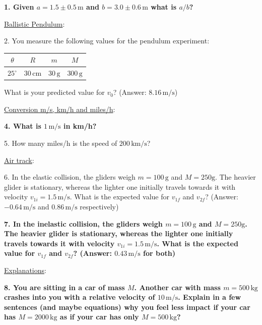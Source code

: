 {\bf{1. Given $a = 1.5 \pm 0.5\, \textrm{m}$ and $b = 3.0 \pm 0.6\, \textrm{m}$ what is $a/b$?}}\myskip

\noindent\underline{Ballistic Pendulum}:\myskip

2. You measure the following values for the pendulum experiment:
\begin{table}[h]
  \centering
  \begin{tabular}{|c|c|c|c|}
    \hline
    $\theta$&$R$&$m$&$M$\\
    \hline
    $25^\circ$ & $30\,\mathrm{cm}$ & $30\,\textrm{g}$ & $300\,\textrm{g}$\\
    \hline
  \end{tabular}
\end{table}

What is your predicted value for $v_0$? (Answer: $8.16\,\mathrm{m/s}$)\myskip

\noindent\underline{Conversion m/s, km/h and miles/h}: \myskip

{\bf{4. What is $1\, \textrm{m/s}$ in km/h?}}
\myskip

5. How many miles/h is the speed of $200\,\textrm{km/s}$?\myskip


\noindent\underline{Air track}:\myskip

6. In the elastic collision, the gliders weigh $m = 100\,\textrm{g}$ and $M = 250\textrm{g}$. The heavier glider is stationary, whereas the lighter one initially travels towards it with velocity $v_{1i} = 1.5\,\mathrm{m/s}$. What is the expected value for $v_{1f}$ and $v_{2f}$? (Answer: $-0.64\,\mathrm{m/s}$ and $0.86\,\mathrm{m/s}$ respectively)\myskip

{\bf{7. In the inelastic collision, the gliders weigh $m = 100\,\textrm{g}$ and $M = 250\textrm{g}$. The heavier glider is stationary, whereas the lighter one initially travels towards it with velocity $v_{1i} = 1.5\,\mathrm{m/s}$. What is the expected value for $v_{1f}$ and $v_{2f}$? (Answer: $0.43\,\mathrm{m/s}$ for both)}}
\myskip

\noindent\underline{Explanations}:\myskip

{\bf{8. You are sitting in a car of mass $M$. Another car with mass $m = 500\,\textrm{kg}$ crashes into you with a relative velocity of $10\,\textrm{m/s}$. Explain in a few sentences (and maybe equations) why you feel less impact if your car has $M = 2000\,\textrm{kg}$ as if your car has only $M = 500\,\textrm{kg}$? }}
